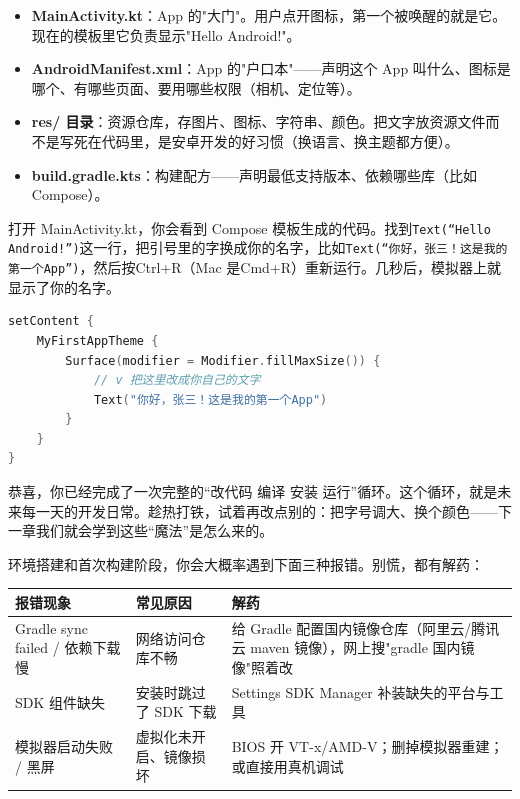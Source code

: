 \begin{itemize}
  \item \textbf{MainActivity.kt}：App 的"大门"。用户点开图标，第一个被唤醒的就是它。现在的模板里它负责显示"Hello Android!"。
  \item \textbf{AndroidManifest.xml}：App 的"户口本"——声明这个 App 叫什么、图标是哪个、有哪些页面、要用哪些权限（相机、定位等）。
  \item \textbf{res/ 目录}：资源仓库，存图片、图标、字符串、颜色。把文字放资源文件而不是写死在代码里，是安卓开发的好习惯（换语言、换主题都方便）。
  \item \textbf{build.gradle.kts}：构建配方——声明最低支持版本、依赖哪些库（比如 Compose）。
\end{itemize}


打开 MainActivity.kt，你会看到 Compose 模板生成的代码。找到\texttt{Text(“Hello Android!”)}这一行，把引号里的字换成你的名字，比如\texttt{Text(“你好，张三！这是我的第一个App”)}，然后按Ctrl+R（Mac 是Cmd+R）重新运行。几秒后，模拟器上就显示了你的名字。

\begin{lstlisting}[language=Kotlin]
setContent {
    MyFirstAppTheme {
        Surface(modifier = Modifier.fillMaxSize()) {
            // v 把这里改成你自己的文字
            Text("你好，张三！这是我的第一个App")
        }
    }
}
\end{lstlisting}

恭喜，你已经完成了一次完整的“改代码 编译 安装 运行”循环。这个循环，就是未来每一天的开发日常。趁热打铁，试着再改点别的：把字号调大、换个颜色——下一章我们就会学到这些“魔法”是怎么来的。


环境搭建和首次构建阶段，你会大概率遇到下面三种报错。别慌，都有解药：

\begin{center}
\begin{tabularx}{\linewidth}{|X|X|X|}
\hline
\textbf{报错现象} & \textbf{常见原因} & \textbf{解药} \tabularnewline
\hline
Gradle sync failed / 依赖下载慢 & 网络访问仓库不畅 & 给 Gradle 配置国内镜像仓库（阿里云/腾讯云 maven 镜像），网上搜"gradle 国内镜像"照着改 \tabularnewline
SDK 组件缺失 & 安装时跳过了 SDK 下载 & Settings SDK Manager 补装缺失的平台与工具 \tabularnewline
模拟器启动失败 / 黑屏 & 虚拟化未开启、镜像损坏 & BIOS 开 VT-x/AMD-V；删掉模拟器重建；或直接用真机调试 \tabularnewline
\hline
\end{tabularx}
\end{center}

